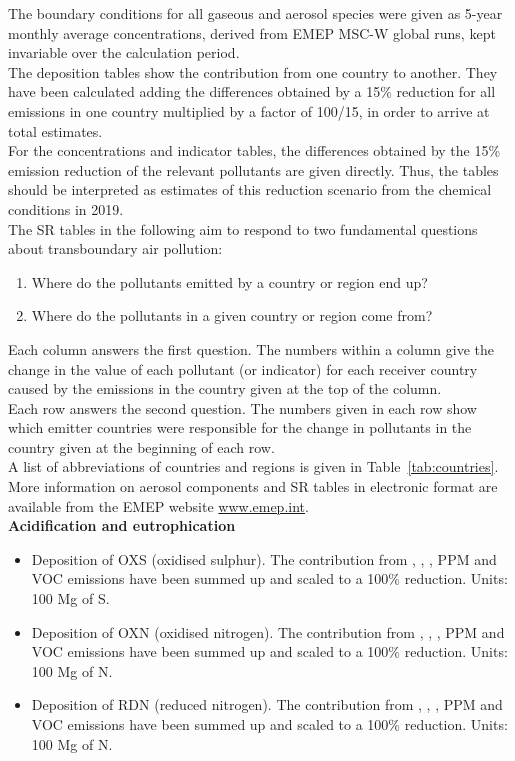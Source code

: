 The boundary conditions for all gaseous and aerosol species were given as 5-year monthly average concentrations, derived from EMEP MSC-W global runs,
kept invariable over the calculation period. \\

The deposition tables show the contribution from one
country to another. They have been calculated adding the differences
obtained by a 15\% reduction for all emissions in one country
multiplied by a factor of 100/15, in order to arrive at total
estimates.\\

For the concentrations and indicator tables, the differences obtained
by the 15\% emission reduction of the relevant pollutants are given
directly. Thus, the tables should be interpreted as estimates of
this reduction scenario from the chemical conditions in 2019.\\

The SR tables in the following aim to respond to two fundamental
questions about transboundary air pollution:

\begin{enumerate}
\item Where do the pollutants emitted by a country or region end up?
\item Where do the pollutants in a given country or region come from?
\end{enumerate}

Each column answers the first question. The numbers within a column
give the change in the value of each pollutant (or indicator) for each
receiver country caused by
the emissions in the country given at the top of the column.\\

Each row answers the second question. The numbers given in each row show
which emitter countries were responsible for the change in
pollutants in the country given at the beginning of each row.\\

A list of abbreviations of countries and regions is given in Table~\ref{tab:countries}.\\

More information on aerosol components and SR tables in 
electronic format are available from the EMEP website \url{www.emep.int}.\\


\textbf{Acidification and eutrophication}
\begin{itemize}
\item Deposition of OXS (oxidised sulphur). The contribution from \sox,
  \nox, \nhiii, PPM and VOC emissions have been summed up and scaled to a
  100\% reduction. Units: 100 Mg of S.
\item Deposition of OXN (oxidised nitrogen). The contribution from \sox,
  \nox, \nhiii, PPM and VOC emissions have been summed up and scaled to a
  100\% reduction. Units: 100 Mg of N.
\item Deposition of RDN (reduced nitrogen). The contribution from \sox,
  \nox, \nhiii, PPM and VOC emissions have been summed up and scaled to a
  100\% reduction. Units: 100 Mg of N.
\end{itemize}
\vspace{20pt}

